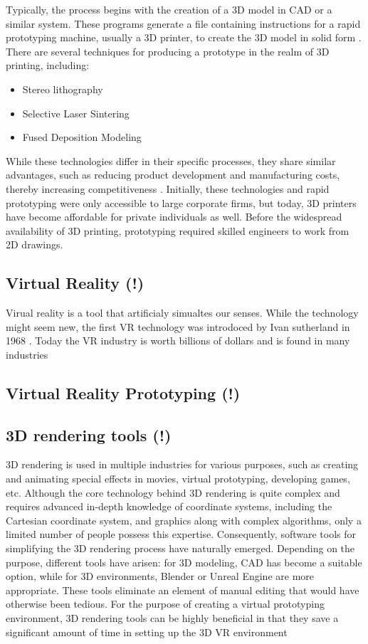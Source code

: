 Typically, the process begins with the creation of a 3D model in CAD or a similar system. 
These programs generate a file containing instructions for a rapid prototyping machine, usually 
a 3D printer, to create the 3D model in solid form \cite{sriharsha2018rapid}. There are several 
techniques for producing a prototype in the realm of 3D printing, including:
\begin{itemize}
    \item Stereo lithography
    \item Selective Laser Sintering
    \item Fused Deposition Modeling
\end{itemize}
While these technologies differ in their specific processes, they share similar advantages, such as 
reducing product development and manufacturing costs, thereby increasing competitiveness 
\cite{PHAM19981257}. Initially, these technologies and rapid prototyping were only accessible to 
large corporate firms, but today, 3D printers have become affordable for private individuals as well. 
Before the widespread availability of 3D printing, prototyping required skilled engineers to work from 
2D drawings.


\subsection{Virtual Reality (!)}
Virual reality  is a tool that artificialy simualtes our senses. While the technology might seem new, 
the first VR technology was introdoced by Ivan sutherland in 1968 \cite{lavalle2023virtual}. Today the VR
industry is worth billions of dollars and is found in many industries
\subsection{Virtual Reality Prototyping (!)}
\subsection{3D rendering tools (!)}
3D rendering is used in multiple industries for various purposes, such as creating and animating special 
effects in movies, virtual prototyping, developing games, etc. Although the core technology behind 3D 
rendering is quite complex and requires advanced in-depth knowledge of coordinate systems, including the 
Cartesian coordinate system, and graphics along with complex algorithms, only a limited number of people 
possess this expertise. Consequently, software tools for simplifying the 3D rendering process have naturally 
emerged. Depending on the purpose, different tools have arisen: for 3D modeling, CAD has become a suitable 
option, while for 3D environments, Blender or Unreal Engine are more appropriate.
\newline \newline
These tools eliminate an element of manual editing that would have otherwise been tedious. For the purpose 
of creating a virtual prototyping environment, 3D rendering tools can be highly beneficial in that they 
save a significant amount of time in setting up the 3D VR environment

